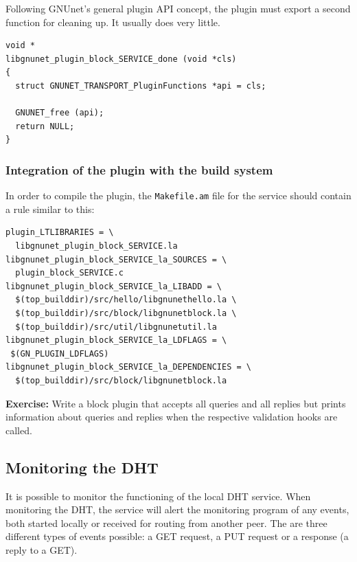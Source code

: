 \documentclass[10pt]{article}
\newcommand{\exercise}[1]{\noindent\begin{boxedminipage}{\textwidth}{\bf Exercise:} #1 \end{boxedminipage}}
\begin{document}
Following GNUnet's general plugin API concept, the plugin must 
export a second function for cleaning up.  It usually does very
little.

\lstset{language=C}
\begin{lstlisting}
void *
libgnunet_plugin_block_SERVICE_done (void *cls)
{
  struct GNUNET_TRANSPORT_PluginFunctions *api = cls;

  GNUNET_free (api);
  return NULL;
}
\end{lstlisting}


\subsubsection{Integration of the plugin with the build system}

In order to compile the plugin, the {\tt Makefile.am} file for the
service should contain a rule similar to this:

\lstset{language=make}
\begin{lstlisting}
plugin_LTLIBRARIES = \
  libgnunet_plugin_block_SERVICE.la
libgnunet_plugin_block_SERVICE_la_SOURCES = \
  plugin_block_SERVICE.c
libgnunet_plugin_block_SERVICE_la_LIBADD = \
  $(top_builddir)/src/hello/libgnunethello.la \
  $(top_builddir)/src/block/libgnunetblock.la \
  $(top_builddir)/src/util/libgnunetutil.la
libgnunet_plugin_block_SERVICE_la_LDFLAGS = \
 $(GN_PLUGIN_LDFLAGS)
libgnunet_plugin_block_SERVICE_la_DEPENDENCIES = \
  $(top_builddir)/src/block/libgnunetblock.la
\end{lstlisting}


\exercise{Write a block plugin that accepts all queries
and all replies but prints information about queries and replies
when the respective validation hooks are called.}



\subsection{Monitoring the DHT}
It is possible to monitor the functioning of the local DHT service. When monitoring
the DHT, the service will alert the monitoring program of any events,
both started locally or received for routing from another peer. The are three different
types of events possible: a GET request, a PUT request or a response (a reply to
a GET).
\end{document}
